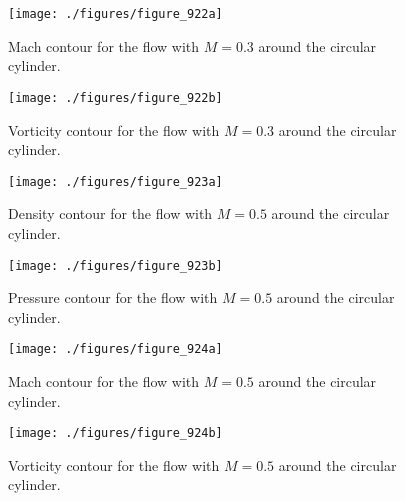 \begin{figure}
\centering
\texttt{[image: ./figures/figure\_922a]} \\
\caption{Mach contour for the flow with $M = 0.3$ around the circular cylinder.}
\label{fig:figure_922a}
\end{figure}

\begin{figure}
\centering
\texttt{[image: ./figures/figure\_922b]} \\
\caption{Vorticity contour for the flow with $M = 0.3$ around the circular cylinder.}
\label{fig:figure_922b}
\end{figure}

\begin{figure}
\centering
\texttt{[image: ./figures/figure\_923a]} \\
\caption{Density contour for the flow with $M = 0.5$ around the circular cylinder.}
\label{fig:figure_923a}
\end{figure}

\begin{figure}
\centering
\texttt{[image: ./figures/figure\_923b]} \\
\caption{Pressure contour for the flow with $M = 0.5$ around the circular cylinder.}
\label{fig:figure_923b}
\end{figure}

\begin{figure}
\centering
\texttt{[image: ./figures/figure\_924a]} \\
\caption{Mach contour for the flow with $M = 0.5$ around the circular cylinder.}
\label{fig:figure_924a}
\end{figure}

\begin{figure}
\centering
\texttt{[image: ./figures/figure\_924b]} \\
\caption{Vorticity contour for the flow with $M = 0.5$ around the circular cylinder.}
\label{fig:figure_924b}
\end{figure}
\newpage
